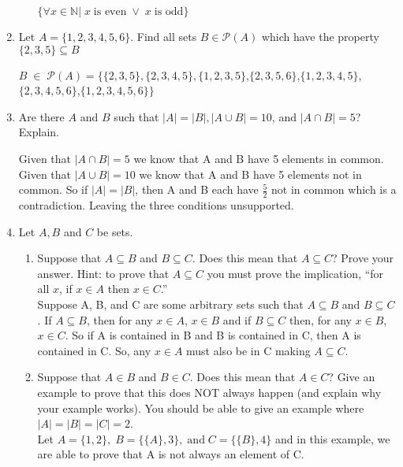 \documentclass[11pt, a4paper]{article}
\newcommand\setItemNumber[1]{\setcounter{enumi}{\numexpr#1-1\relax}}
\begin{document}
\begin{enumerate}
\begin{enumerate}
                $\{\forall x\in\mathbb{N}|\; x\; \text{is even}\; \lor\; x\; \text{is odd}\}$ %

        \end{enumerate}

    \setItemNumber{19}
    \item Let $A = \{1,2,3,4,5,6\}$. Find all sets $B\in\mathcal{P}(A)$ which have the property $\{2,3,5\}\subseteq B$

        $B \;\in\;\mathcal{P}(A) = \{\{2,3,5\},\{2,3,4,5\},\{1,2,3,5\}$,$\{2,3,5,6\}$,$\{1,2,3,4,5\}$,$\{2,3,4,5,6\}$,$\{1,2,3,4,5,6\}\}$

    \setItemNumber{22}
    \item Are there $A$ and $B$ such that $|A| = |B|,|A\cup B| = 10$, and $|A\cap B| = 5$? Explain.

        Given that $|A\cap B|=5$ we know that A and B have 5 elements in common. Given that $|A\cup B|= 10$ we know that A and B have 5 elements not in common. So if $|A|=|B|$, then A and B each have $\frac{5}{2}$ not in common which is a contradiction. Leaving the three conditions unsupported.

    \setItemNumber{25}
    \item Let $A, B$ and $C$ be sets.
        \begin{enumerate}
            \item Suppose that $A \subseteq B$ and $B\subseteq C$. Does this mean that $A \subseteq C$? Prove your answer. Hint: to prove that $A\subseteq C$ you must prove the implication, “for all $x$, if $x\in A$ then $x\in C$.”\\

                Suppose A, B, and C are some arbitrary sets such that $A\subseteq B$ and $B\subseteq C$. If $A\subseteq B$, then for any $x\in A$, $x\in B$ and if $B\subseteq C$ then, for any $x\in B$, $x\in C$. So if A is contained in B and B is contained in C, then A is contained in C. So, any $x\in A$ must also be in C making $A\subseteq C$.\\


            \item Suppose that $A\in B$ and $B\in C$. Does this mean that $A\in C$? Give an example to prove that this does NOT always happen (and explain why your example works). You should be able to give an example where $|A|=|B|=|C|=2$.\\

        Let $A =\{1,2\},\;B = \{\{A\}, 3\},\;\text{and}\; C = \{\{B\},4\}$ and in this example, we are able to prove that A is not always an element of C. 


\end{enumerate}
\end{enumerate}
\end{document}
